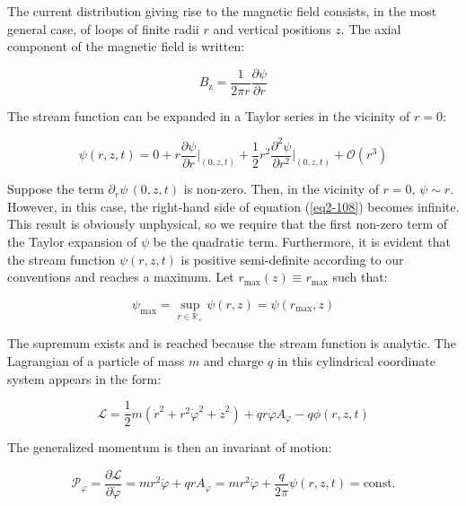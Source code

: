 The current distribution giving rise to the magnetic field consists, in the most general case, of loops of finite radii $r$ and vertical positions $z$. The axial component of the magnetic field is written:

\begin{equation}
    B_\text{z}=\frac{1}{2\pi r}\frac{\partial\psi}{\partial r}
\end{equation}

The stream function can be expanded in a Taylor series in the vicinity of $r=0$:

\begin{equation}
    \psi(r,z,t)=0+r\frac{\partial\psi}{\partial r}\biggr|_{(0,z,t)}+\frac{1}{2}r^2\frac{\partial^2\psi}{\partial r ^2}\biggr|_{(0,z,t)}+\mathcal{O}(r^3)
\end{equation}

Suppose the term $\partial_r\psi\,(0,z,t)$ is non-zero. Then, in the vicinity of $r=0$, $\psi\sim r$. However, in this case, the right-hand side of equation (\ref{eq2-108}) becomes infinite. This result is obviously unphysical, so we require that the first non-zero term of the Taylor expansion of $\psi$ be the quadratic term. Furthermore, it is evident that the stream function $\psi(r,z,t)$ is positive semi-definite according to our conventions and reaches a maximum. Let $r_\text{max}(z)\equiv r_\text{max}$ such that:

\begin{equation}
    \psi_\text{max}=\sup_{r\in\mathbb{R}_+}\psi(r,z)=\psi(r_\text{max}, z)
\end{equation}

The supremum exists and is reached because the stream function is analytic. The Lagrangian of a particle of mass $m$ and charge $q$ in this cylindrical coordinate system appears in the form:

\begin{equation}
    \mathcal{L}=\frac{1}{2}m\left(\dot{r}^2+r^2\dot{\varphi}^2+\dot{z}^2\right)+qr\dot{\varphi}A_\varphi-q\phi(r,z,t)
\end{equation}

The generalized momentum is then an invariant of motion:

\begin{equation}
    \label{eq2-113}
    \mathcal{P}_\varphi=\frac{\partial\mathcal{L}}{\partial\dot{\varphi}}=mr^2\dot{\varphi}+qrA_\varphi=mr^2\dot{\varphi}+\frac{q}{2\pi}\psi(r,z,t)=\text{const.}
\end{equation}

